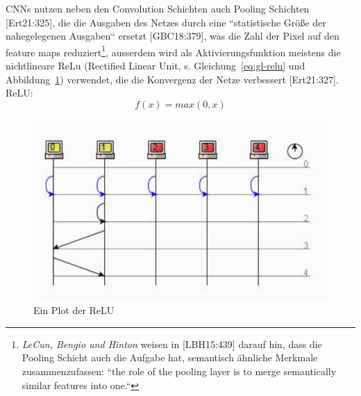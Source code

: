 CNNs nutzen neben den Convolution Schichten auch Pooling Schichten [Ert21:325], die die Ausgaben des Netzes durch eine ``statistische Größe der nahegelegenen Ausgaben`` ersetzt [GBC18:379], was die Zahl der Pixel auf den feature maps reduziert\footnote{ \textit{LeCun, Bengio und Hinton} weisen in [LBH15:439] darauf hin, dass die Pooling Schicht auch die Aufgabe hat, semantisch ähnliche Merkmale zusammenzufassen: ``the role of the pooling layer is to merge semantically similar features into one.``
}, ausserdem wird als Aktivierungsfunktion meistens die nichtlineare ReLu (Rectified Linear Unit, s. Gleichung~\ref{eq:gl-relu} und Abbildung~\ref{fig-relu}) verwendet, die die Konvergenz der Netze verbessert [Ert21:327].\\

ReLU:
\begin{equation} f(x) = max(0, x)
    \label{eq:gl-relu}
\end{equation}


\begin{figure}[h]
    \centering
    \includegraphics{images/p1ReadSeq.pdf}
    \caption{Ein Plot der ReLU}
    \label{fig-relu}
\end{figure}




